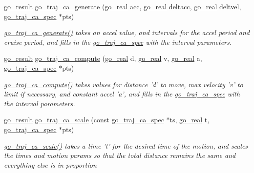 \begin{DoxyCompactItemize}
\item 
\hyperlink{gotypes_8h_a55d48b38cd959f63c7e8db8337a9792a}{go\-\_\-result} \hyperlink{namespacegomotion_ad926ed07425571d1df303c65bc22161f}{go\-\_\-traj\-\_\-ca\-\_\-generate} (\hyperlink{gotypes_8h_afd666a2393eebd71ee455846ac9def9b}{go\-\_\-real} acc, \hyperlink{gotypes_8h_afd666a2393eebd71ee455846ac9def9b}{go\-\_\-real} deltacc, \hyperlink{gotypes_8h_afd666a2393eebd71ee455846ac9def9b}{go\-\_\-real} deltvel, \hyperlink{structgomotion_1_1go__traj__ca__spec}{go\-\_\-traj\-\_\-ca\-\_\-spec} $\ast$pts)
\begin{DoxyCompactList}\small\item\em \hyperlink{namespacegomotion_ad926ed07425571d1df303c65bc22161f}{go\-\_\-traj\-\_\-ca\-\_\-generate()} takes an accel value, and intervals for the accel period and cruise period, and fills in the \hyperlink{structgomotion_1_1go__traj__ca__spec}{go\-\_\-traj\-\_\-ca\-\_\-spec} with the interval parameters. \end{DoxyCompactList}\item 
\hyperlink{gotypes_8h_a55d48b38cd959f63c7e8db8337a9792a}{go\-\_\-result} \hyperlink{namespacegomotion_a7c957035ba66766366a69beed80f9193}{go\-\_\-traj\-\_\-ca\-\_\-compute} (\hyperlink{gotypes_8h_afd666a2393eebd71ee455846ac9def9b}{go\-\_\-real} d, \hyperlink{gotypes_8h_afd666a2393eebd71ee455846ac9def9b}{go\-\_\-real} v, \hyperlink{gotypes_8h_afd666a2393eebd71ee455846ac9def9b}{go\-\_\-real} a, \hyperlink{structgomotion_1_1go__traj__ca__spec}{go\-\_\-traj\-\_\-ca\-\_\-spec} $\ast$pts)
\begin{DoxyCompactList}\small\item\em \hyperlink{namespacegomotion_a7c957035ba66766366a69beed80f9193}{go\-\_\-traj\-\_\-ca\-\_\-compute()} takes values for distance 'd' to move, max velocity 'v' to limit if necessary, and constant accel 'a', and fills in the \hyperlink{structgomotion_1_1go__traj__ca__spec}{go\-\_\-traj\-\_\-ca\-\_\-spec} with the interval parameters. \end{DoxyCompactList}\item 
\hyperlink{gotypes_8h_a55d48b38cd959f63c7e8db8337a9792a}{go\-\_\-result} \hyperlink{namespacegomotion_a116794cb4157c4f54caf98f65a2ec44f}{go\-\_\-traj\-\_\-ca\-\_\-scale} (const \hyperlink{structgomotion_1_1go__traj__ca__spec}{go\-\_\-traj\-\_\-ca\-\_\-spec} $\ast$ts, \hyperlink{gotypes_8h_afd666a2393eebd71ee455846ac9def9b}{go\-\_\-real} t, \hyperlink{structgomotion_1_1go__traj__ca__spec}{go\-\_\-traj\-\_\-ca\-\_\-spec} $\ast$pts)
\begin{DoxyCompactList}\small\item\em \hyperlink{namespacegomotion_a116794cb4157c4f54caf98f65a2ec44f}{go\-\_\-traj\-\_\-ca\-\_\-scale()} takes a time 't' for the desired time of the motion, and scales the times and motion params so that the total distance remains the same and everything else is in proportion \end{DoxyCompactList}\item 

\end{DoxyCompactItemize}
